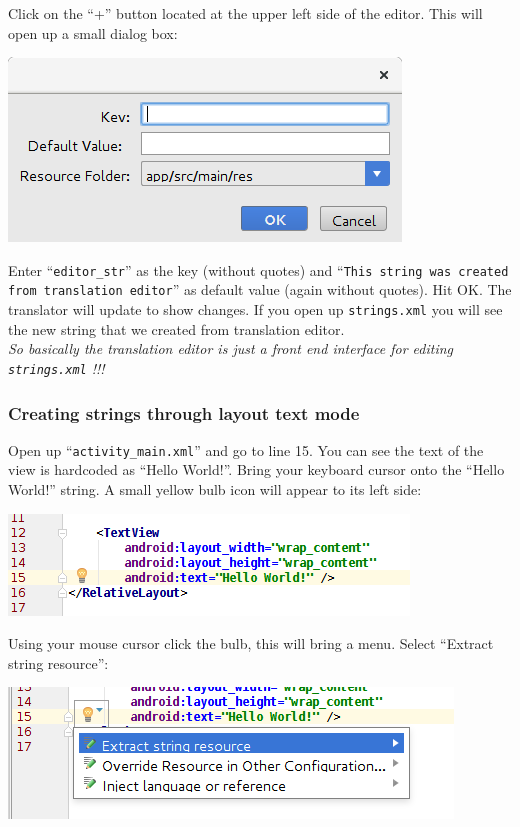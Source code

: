 Click on the ``+'' button located at the upper left side of the editor. This will open up a small dialog box:

\begin{center}
	\includegraphics[scale=0.4]{chapters/ch04/images/10}
\end{center}

Enter ``\texttt{editor\_str}'' as the key (without quotes) and ``\texttt{This string was created from translation editor}'' as default value (again without quotes). Hit OK. The translator will update to show changes. If you open up \texttt{strings.xml} you will see the new string that we created from translation editor. \\

\textit{So basically the translation editor is just a front end interface for editing \texttt{strings.xml} !!!}

\subsubsection{Creating strings through layout text mode}
Open up ``\texttt{activity\_main.xml}'' and go to line 15. You can see the text of the view is hardcoded as ``Hello World!''. Bring your keyboard cursor onto the ``Hello World!'' string. A small yellow bulb icon will appear to its left side:

\begin{center}
	\includegraphics[scale=0.4]{chapters/ch04/images/12}
\end{center}

Using your mouse cursor click the bulb, this will bring a menu. Select ``Extract string resource'':

\begin{center}
	\includegraphics[scale=0.4]{chapters/ch04/images/13}
\end{center}

